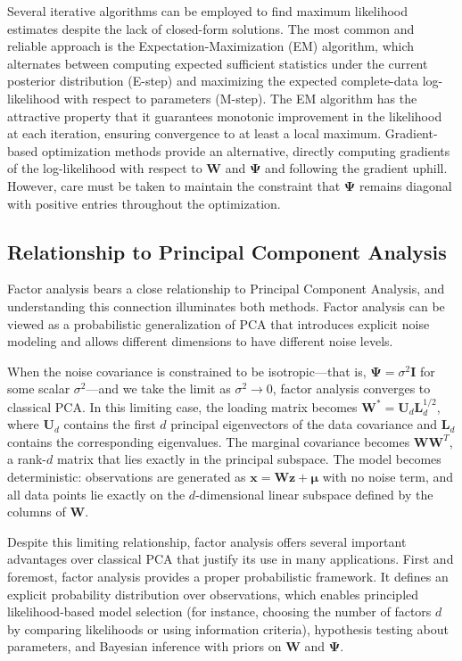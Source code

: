 Several iterative algorithms can be employed to find maximum likelihood estimates despite the lack of closed-form solutions. The most common and reliable approach is the Expectation-Maximization (EM) algorithm, which alternates between computing expected sufficient statistics under the current posterior distribution (E-step) and maximizing the expected complete-data log-likelihood with respect to parameters (M-step). The EM algorithm has the attractive property that it guarantees monotonic improvement in the likelihood at each iteration, ensuring convergence to at least a local maximum. Gradient-based optimization methods provide an alternative, directly computing gradients of the log-likelihood with respect to $\mathbf{W}$ and $\boldsymbol{\Psi}$ and following the gradient uphill. However, care must be taken to maintain the constraint that $\boldsymbol{\Psi}$ remains diagonal with positive entries throughout the optimization.

\subsection*{Relationship to Principal Component Analysis}

Factor analysis bears a close relationship to Principal Component Analysis, and understanding this connection illuminates both methods. Factor analysis can be viewed as a probabilistic generalization of PCA that introduces explicit noise modeling and allows different dimensions to have different noise levels.

When the noise covariance is constrained to be isotropic—that is, $\boldsymbol{\Psi} = \sigma^2\mathbf{I}$ for some scalar $\sigma^2$—and we take the limit as $\sigma^2 \to 0$, factor analysis converges to classical PCA. In this limiting case, the loading matrix becomes $\mathbf{W}^* = \mathbf{U}_d\mathbf{L}_d^{1/2}$, where $\mathbf{U}_d$ contains the first $d$ principal eigenvectors of the data covariance and $\mathbf{L}_d$ contains the corresponding eigenvalues. The marginal covariance becomes $\mathbf{W}\mathbf{W}^T$, a rank-$d$ matrix that lies exactly in the principal subspace. The model becomes deterministic: observations are generated as $\mathbf{x} = \mathbf{W}\mathbf{z} + \boldsymbol{\mu}$ with no noise term, and all data points lie exactly on the $d$-dimensional linear subspace defined by the columns of $\mathbf{W}$.

Despite this limiting relationship, factor analysis offers several important advantages over classical PCA that justify its use in many applications. First and foremost, factor analysis provides a proper probabilistic framework. It defines an explicit probability distribution over observations, which enables principled likelihood-based model selection (for instance, choosing the number of factors $d$ by comparing likelihoods or using information criteria), hypothesis testing about parameters, and Bayesian inference with priors on $\mathbf{W}$ and $\boldsymbol{\Psi}$.


